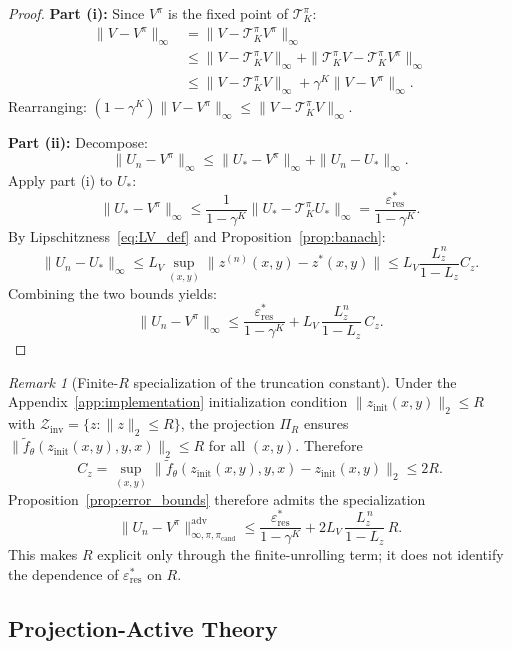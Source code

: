 \documentclass{article}
\theoremstyle{plain}
\theoremstyle{definition}
\theoremstyle{remark}
\newtheorem{remark}[theorem]{Remark}
\begin{document}
\begin{proof}
\textbf{Part (i):}
Since $V^\pi$ is the fixed point of $\mathcal{T}^\pi_K$:
\begin{align*}
\|V - V^\pi\|_\infty &= \|V - \mathcal{T}^\pi_K V^\pi\|_\infty \\
&\le \|V - \mathcal{T}^\pi_K V\|_\infty + \|\mathcal{T}^\pi_K V - \mathcal{T}^\pi_K V^\pi\|_\infty \\
&\le \|V - \mathcal{T}^\pi_K V\|_\infty + \gamma^K\|V - V^\pi\|_\infty.
\end{align*}
Rearranging: $(1-\gamma^K)\|V-V^\pi\|_\infty \le \|V - \mathcal{T}^\pi_K V\|_\infty$.

\textbf{Part (ii):}
Decompose:
\[
\|U_n - V^\pi\|_\infty \le \|U_* - V^\pi\|_\infty + \|U_n - U_*\|_\infty.
\]
Apply part (i) to $U_*$:
\[
\|U_* - V^\pi\|_\infty \le \frac{1}{1-\gamma^K}\|U_* - \mathcal{T}^\pi_K U_*\|_\infty = \frac{\varepsilon_{\mathrm{res}}^*}{1-\gamma^K}.
\]
By Lipschitzness~\eqref{eq:LV_def} and Proposition~\ref{prop:banach}:
\[
\|U_n - U_*\|_\infty \le L_V \sup_{(x,y)}\|z^{(n)}(x,y) - z^*(x,y)\| \le L_V \frac{L_z^n}{1-L_z} C_z.
\]
Combining the two bounds yields:
\[
\|U_n - V^\pi\|_\infty
\le
\frac{\varepsilon_{\mathrm{res}}^*}{1-\gamma^K}
+
L_V\,\frac{L_z^n}{1-L_z}\,C_z.
\]
\end{proof}

\begin{remark}[Finite-$R$ specialization of the truncation constant]
\label{rem:finite_R_Cz}
Under the Appendix~\ref{app:implementation} initialization condition
$\|z_{\mathrm{init}}(x,y)\|_2\le R$ with
$\mathcal{Z}_{\mathrm{inv}}=\{z:\|z\|_2\le R\}$, the projection
$\Pi_R$ ensures $\|\tilde f_\theta(z_{\mathrm{init}}(x,y),y,x)\|_2\le R$
for all $(x,y)$. Therefore
\[
C_z
=
\sup_{(x,y)}
\|\tilde f_\theta(z_{\mathrm{init}}(x,y),y,x)-z_{\mathrm{init}}(x,y)\|_2
\le 2R.
\]
Proposition~\ref{prop:error_bounds} therefore admits the specialization
\[
\|U_n - V^\pi\|_{\infty,\pi,\pi_{\mathrm{cand}}}^{\mathrm{adv}}
\le
\frac{\varepsilon_{\mathrm{res}}^*}{1-\gamma^K}
+
2L_V\,\frac{L_z^{\,n}}{1-L_z}\,R.
\]
This makes $R$ explicit only through the finite-unrolling term; it does not
identify the dependence of $\varepsilon_{\mathrm{res}}^*$ on $R$.
\end{remark}

\subsection{Projection-Active Theory}
\label{app:projection_theory}
\end{document}
